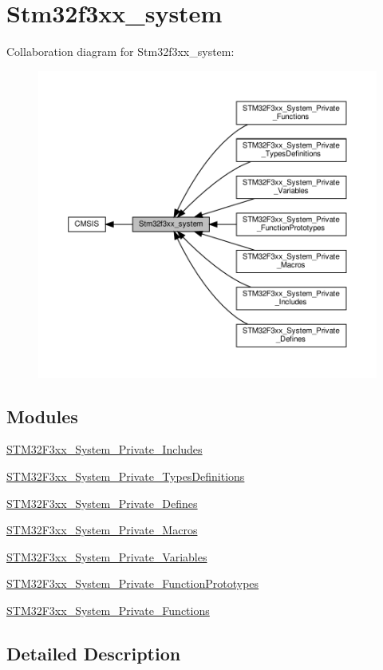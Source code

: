 \hypertarget{group__stm32f3xx__system}{}\section{Stm32f3xx\+\_\+system}
\label{group__stm32f3xx__system}
Collaboration diagram for Stm32f3xx\+\_\+system\+:\nopagebreak
\begin{figure}[H]
\begin{center}
\leavevmode
\includegraphics[width=350pt]{group__stm32f3xx__system}
\end{center}
\end{figure}
\subsection*{Modules}
\begin{DoxyCompactItemize}
\item 
\hyperlink{group__STM32F3xx__System__Private__Includes}{S\+T\+M32\+F3xx\+\_\+\+System\+\_\+\+Private\+\_\+\+Includes}
\item 
\hyperlink{group__STM32F3xx__System__Private__TypesDefinitions}{S\+T\+M32\+F3xx\+\_\+\+System\+\_\+\+Private\+\_\+\+Types\+Definitions}
\item 
\hyperlink{group__STM32F3xx__System__Private__Defines}{S\+T\+M32\+F3xx\+\_\+\+System\+\_\+\+Private\+\_\+\+Defines}
\item 
\hyperlink{group__STM32F3xx__System__Private__Macros}{S\+T\+M32\+F3xx\+\_\+\+System\+\_\+\+Private\+\_\+\+Macros}
\item 
\hyperlink{group__STM32F3xx__System__Private__Variables}{S\+T\+M32\+F3xx\+\_\+\+System\+\_\+\+Private\+\_\+\+Variables}
\item 
\hyperlink{group__STM32F3xx__System__Private__FunctionPrototypes}{S\+T\+M32\+F3xx\+\_\+\+System\+\_\+\+Private\+\_\+\+Function\+Prototypes}
\item 
\hyperlink{group__STM32F3xx__System__Private__Functions}{S\+T\+M32\+F3xx\+\_\+\+System\+\_\+\+Private\+\_\+\+Functions}
\end{DoxyCompactItemize}


\subsection{Detailed Description}
